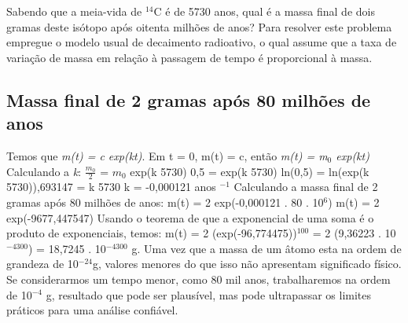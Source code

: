 Sabendo que a meia-vida de $^{14}$C é de 5730 anos, qual é a massa final de dois gramas deste isótopo após oitenta milhões de anos? Para resolver este problema empregue o modelo usual de decaimento radioativo, o qual assume que a taxa de variação de massa em relação à passagem de tempo é proporcional à massa.

\subsection{Massa final de 2 gramas após 80 milhões de anos}
Temos que \textit{m(t) = c exp(kt)}. Em t = 0, m(t) = c, então \textit{m(t) = m$_{0}$ exp(kt)} \newline
Calculando a \textit{k}: $\frac{m_0}{2}$ = $m_0$ exp(k 5730)
0,5 = exp(k 5730)\newline
ln(0,5) = ln(exp(k 5730)),693147 = k 5730 \newline
k = -0,000121 anos $^{-1}$ \newline
Calculando a massa final de 2 gramas após 80 milhões de anos: \newline
m(t) = 2 exp(-0,000121 . 80 . 10$^{6}$) \newline
m(t) = 2 exp(-9677,447547) \newline
Usando o teorema de que a exponencial de uma soma é o produto de exponenciais, temos:\newline
m(t) = 2 (exp(-96,774475))$^{100}$ = 2 (9,36223 . 10$^{-4300}$) = 18,7245 . 10$^{-4300}$ g.\newline
Uma vez que a massa de um âtomo esta na ordem de grandeza de 10$^{-24}$g, valores menores do que isso não apresentam significado físico. Se considerarmos um tempo menor, como 80 mil anos, trabalharemos na ordem de 10$^{-4}$ g, resultado que pode ser plausível, mas pode ultrapassar os limites práticos para uma análise confiável.
